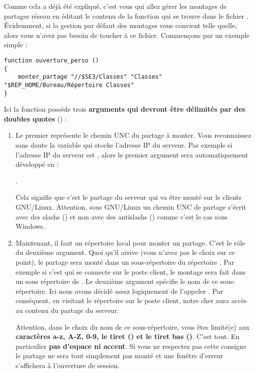 Comme cela a déjà été expliqué, c'est vous qui allez gérer
les montages de partages réseau en éditant le contenu de la
fonction  qui se trouve dans le fichier
. Évidemment, si la gestion par défaut
des montages vous convient telle quelle, alors vous n'avez pas besoin
de toucher à ce fichier.
Commençons par un exemple simple :
%
\begin{lstlisting}
function ouverture_perso ()
{
    monter_partage "//$SE3/Classes" "Classes" "$REP_HOME/Bureau/Répertoire Classes"
}
\end{lstlisting}
%
Ici la fonction 
possède trois \textbf{arguments qui devront être délimités
par des doubles quotes} () :
%
\begin{enumerate}
\item Le premier représente le chemin UNC du partage à monter.
Vous reconnaissez sans doute la variable  qui
stocke l'adresse IP du serveur. Par exemple si l'adresse IP
du serveur est , alors le premier argument 
sera automatiquement développé en :
%
\begin{center}
.
\end{center}
%
Cela signifie que c'est le partage  du serveur
 qui va être monté sur le clients GNU/Linux.
Attention, sous GNU/Linux un chemin UNC de partage s'écrit avec des
slashs (\verbtexte{/}) et non avec des antislashs 
(\verbtexte{$\backslash$}) comme c'est le cas
sous Windows.

\item Maintenant, il faut un répertoire local pour monter un partage.
C'est le rôle du deuxième argument. Quoi qu'il arrive (vous n'avez pas
le choix sur ce point), le partage
sera monté dans un sous-répertoire du répertoire .
Par exemple si c'est  qui se connecte sur le poste
client, le montage sera fait dans un sous répertoire de .
Le deuxième argument spécifie le nom de ce sous-répertoire. Ici nous
avons décidé assez logiquement de l'appeler .
Par conséquent, en visitant le répertoire 
sur le poste client, notre cher  aura accès au
contenu du partage  du serveur.

Attention, dans le choix du nom de ce sous-répertoire, vous êtes
limité(e) aux \textbf{caractères a-z, A-Z, 0-9, le tiret (\verbtexte{-})
et le tiret bas (\verbtexte{\_})}.
C'est tout. En particulier \textbf{pas d'espace ni accent}.
Si vous ne respectez pas cette consigne le partage ne sera tout
simplement pas monté et une fenêtre d'erreur s'affichera à l'ouverture
de session.


\end{enumerate}
